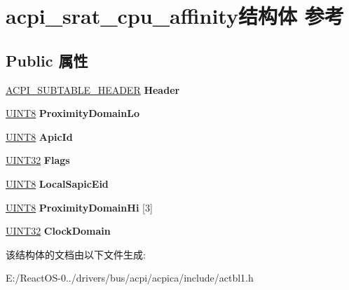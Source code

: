 \hypertarget{structacpi__srat__cpu__affinity}{}\section{acpi\+\_\+srat\+\_\+cpu\+\_\+affinity结构体 参考}
\label{structacpi__srat__cpu__affinity}
\subsection*{Public 属性}
\begin{DoxyCompactItemize}
\item 
\mbox{\label{structacpi__srat__cpu__affinity_a519407256b8ea88ce18fe1c335b4ff70}} 
\hyperlink{structacpi__subtable__header}{A\+C\+P\+I\+\_\+\+S\+U\+B\+T\+A\+B\+L\+E\+\_\+\+H\+E\+A\+D\+ER} {\bfseries Header}
\item 
\mbox{\label{structacpi__srat__cpu__affinity_a4cb2814c396612de4cdccd73793d6946}} 
\hyperlink{_processor_bind_8h_ab27e9918b538ce9d8ca692479b375b6a}{U\+I\+N\+T8} {\bfseries Proximity\+Domain\+Lo}
\item 
\mbox{\label{structacpi__srat__cpu__affinity_a209eb39247c5b48d6aa52bb352aa21a7}} 
\hyperlink{_processor_bind_8h_ab27e9918b538ce9d8ca692479b375b6a}{U\+I\+N\+T8} {\bfseries Apic\+Id}
\item 
\mbox{\label{structacpi__srat__cpu__affinity_a734194e7ef90e60ff4f0f1c5ec036fd6}} 
\hyperlink{_processor_bind_8h_ae1e6edbbc26d6fbc71a90190d0266018}{U\+I\+N\+T32} {\bfseries Flags}
\item 
\mbox{\label{structacpi__srat__cpu__affinity_ac33d28a4dce358c10e5e7e9c727ab339}} 
\hyperlink{_processor_bind_8h_ab27e9918b538ce9d8ca692479b375b6a}{U\+I\+N\+T8} {\bfseries Local\+Sapic\+Eid}
\item 
\mbox{\label{structacpi__srat__cpu__affinity_a85639c963eb470c65336ec54f9495123}} 
\hyperlink{_processor_bind_8h_ab27e9918b538ce9d8ca692479b375b6a}{U\+I\+N\+T8} {\bfseries Proximity\+Domain\+Hi} \mbox{[}3\mbox{]}
\item 
\mbox{\label{structacpi__srat__cpu__affinity_a7ec821ad66dc8376853bb2c013c39e9f}} 
\hyperlink{_processor_bind_8h_ae1e6edbbc26d6fbc71a90190d0266018}{U\+I\+N\+T32} {\bfseries Clock\+Domain}
\end{DoxyCompactItemize}


该结构体的文档由以下文件生成\+:\begin{DoxyCompactItemize}
\item 
E\+:/\+React\+O\+S-\/0../drivers/bus/acpi/acpica/include/actbl1.\+h\end{DoxyCompactItemize}
